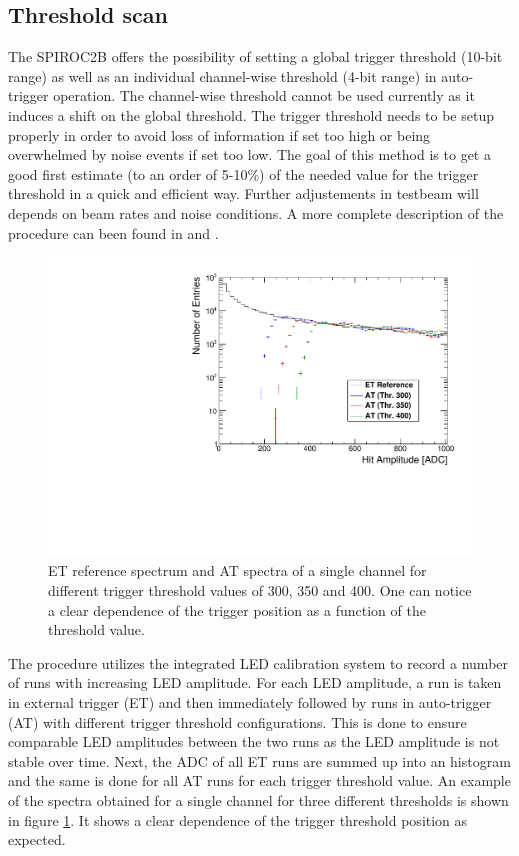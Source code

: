 \subsection{Threshold scan}

The SPIROC2B offers the possibility of setting a global trigger threshold (10-bit range) as well as an individual channel-wise threshold (4-bit range) in auto-trigger operation. The channel-wise threshold cannot be used currently as it induces a shift on the global threshold. The trigger threshold needs to be setup properly in order to avoid loss of information if set too high or being overwhelmed by noise events if set too low. The goal of this method is to get a good first estimate (to an order of 5-10\%) of the needed value for the trigger threshold in a quick and efficient way. Further adjustements in testbeam will depends on beam rates and noise conditions. A more complete description of the procedure can been found in \cite{Hartbrich:2016bbz} and \cite{LloydTrigger}.

\begin{figure}[htbp!]
  \centering
  \includegraphics[width=0.6\linewidth]{../Thesis_Plots/Commissioning/Plots/SpectraADC_HBU2_12.pdf}
  \caption{ET reference spectrum and AT spectra of a single channel for different trigger threshold values of 300, 350 and 400. One can notice a clear dependence of the trigger position as a function of the threshold value.} \label{fig:ADCTriggerThreshold}
\end{figure}

The procedure utilizes the integrated LED calibration system to record a number of runs with increasing LED amplitude. For each LED amplitude, a run is taken in external trigger (ET) and then immediately followed by runs in auto-trigger (AT) with different trigger threshold configurations. This is done to ensure comparable LED amplitudes between the two runs as the LED amplitude is not stable over time. Next, the ADC of all ET runs are summed up into an histogram and the same is done for all AT runs for each trigger threshold value. An example of the spectra obtained for a single channel for three different thresholds is shown in figure \ref{fig:ADCTriggerThreshold}. It shows a clear dependence of the trigger threshold position as expected.

